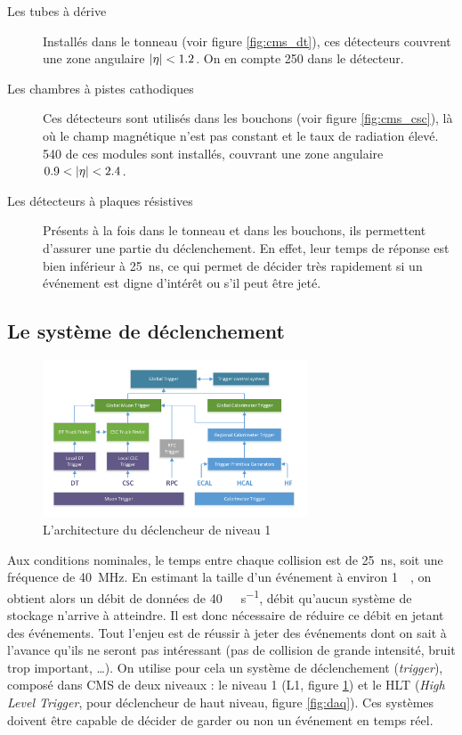 \begin{description}
  \item[Les tubes à dérive] Installés dans le tonneau (voir figure \ref{fig:cms_dt}), ces détecteurs couvrent une zone angulaire $\lvert \eta \rvert < 1.2$. On en compte 250 dans le détecteur.
  \item[Les chambres à pistes cathodiques] Ces détecteurs sont utilisés dans les bouchons (voir figure \ref{fig:cms_csc}), là où le champ magnétique n'est pas constant et le taux de radiation élevé. 540 de ces modules sont installés, couvrant une zone angulaire $\num{0.9} < \lvert \eta \rvert < \num{2.4}$.
  \item[Les détecteurs à plaques résistives] Présents à la fois dans le tonneau et dans les bouchons, ils permettent d'assurer une partie du déclenchement. En effet, leur temps de réponse est bien inférieur à \SI{25}{\ns}, ce qui permet de décider très rapidement si un événement est digne d’intérêt ou s'il peut être jeté.
\end{description}


\subsection{Le système de déclenchement}

\begin{figure} \centering
  \includegraphics[width=0.7\textwidth]{chapitre2/figs/L1.pdf}
  \caption{L'architecture du déclencheur de niveau 1}
  \label{fig:l1}
\end{figure}

Aux conditions nominales, le temps entre chaque collision est de \SI{25}{\ns}, soit une fréquence de \SI{40}{\mega\hertz}. En estimant la taille d'un événement à environ \SI{1}{\mega\octet}, on obtient alors un débit de données de \SI{40}{\tera\octet\per\second}, débit qu'aucun système de stockage n'arrive à atteindre. Il est donc nécessaire de réduire ce débit en jetant des événements. Tout l'enjeu est de réussir à jeter des événements dont on sait à l'avance qu'ils ne seront pas intéressant (pas de collision de grande intensité, bruit trop important, \ldots). On utilise pour cela un système de déclenchement (\emph{trigger}), composé dans CMS de deux niveaux : le niveau 1 (L1, figure \ref{fig:l1}) et le HLT (\emph{High Level Trigger}, pour déclencheur de haut niveau, figure \ref{fig:daq}). Ces systèmes doivent être capable de décider de garder ou non un événement en temps réel.


